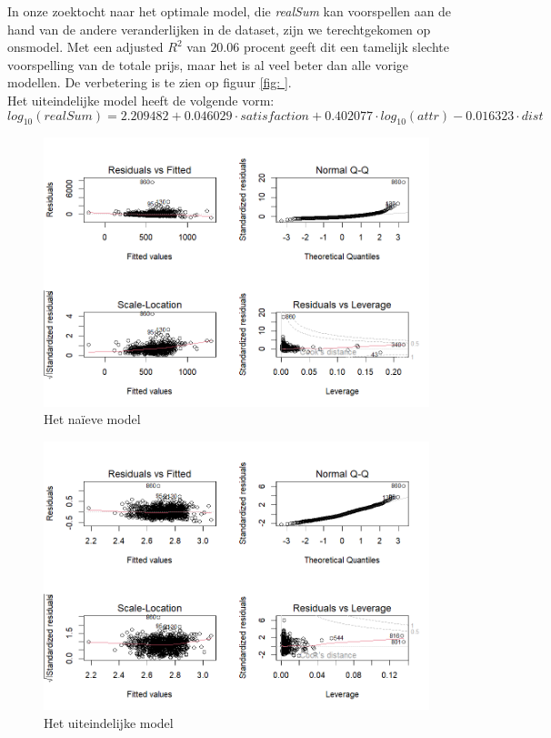 \documentclass[a4paper]{kulakarticle}
\begin{document}
	In onze zoektocht naar het optimale model, die \textit{realSum} kan voorspellen aan de hand van de andere veranderlijken in de dataset, zijn we terechtgekomen op onsmodel. Met een adjusted $R^2$ van $20.06$ procent geeft dit een tamelijk slechte voorspelling van de totale prijs, maar het is al veel beter dan alle vorige modellen. De verbetering is te zien op figuur \ref{fig: }.%
	\\
	Het uiteindelijke model heeft de volgende vorm:
	\begin{equation}
		log_{10}(\textit{realSum}) = 2.209482 + 0.046029\cdot \textit{satisfaction} + 0.402077\cdot log_{10}(\textit{attr}) -0.016323\cdot \textit{dist}
	\end{equation} 

 
\begin{figure}
	\centering
	\includegraphics[width=0.7\linewidth]{Figuren/naiefmodel}
	\caption{Het naïeve model}
	\label{fig:naiefmodel}
\end{figure}


\begin{figure}
	\centering
	\includegraphics[width=0.7\linewidth]{Figuren/onsmodel}
	\caption{Het uiteindelijke model}
	\label{fig:onsmodel}
\end{figure}
\end{document}
